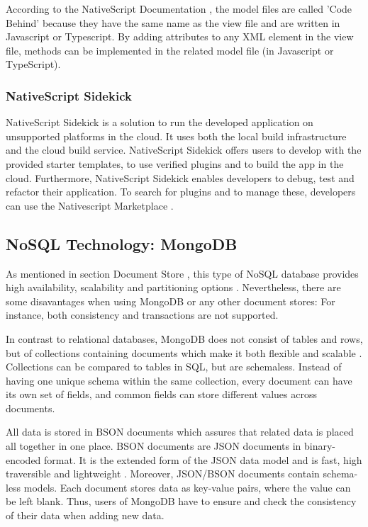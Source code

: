 According to the NativeScript Documentation \cite{nativescript}, the model files are called 'Code Behind' because they have the same name as the view file and are written in Javascript or Typescript. By adding attributes to any XML element in the view file, methods can be implemented in the related model file (in Javascript or TypeScript). 

\subsubsection{NativeScript Sidekick}\label{Native}

NativeScript Sidekick is a solution to run the developed application on unsupported platforms in the cloud. It uses both the local build infrastructure and the cloud build service. NativeScript Sidekick offers users to develop with the provided starter templates, to use verified plugins and to build the app in the cloud. Furthermore, NativeScript Sidekick enables developers to debug, test and refactor their application. 
To search for plugins and to manage these, developers can use the Nativescript Marketplace \cite{nsmarket}.

\subsection{NoSQL Technology: MongoDB}\label{mongodb}

As mentioned in section Document Store , this type of NoSQL database provides high availability, scalability and partitioning options \cite[p.25 ff.]{mongodb_edward}. Nevertheless, there are some disavantages when using MongoDB or any other document stores: For instance, both consistency and transactions are not supported. 

In contrast to relational databases, MongoDB does not consist of tables and rows, but of collections containing documents which make it both flexible and scalable \cite[p.25 ff.]{mongodb_edward}. Collections can be compared to tables in SQL, but are schemaless. Instead of having one unique schema within the same collection, every document can have its own set of fields, and common fields can store different values across documents.  

All data is stored in \ac{BSON} documents which assures that related data is placed all together in one place. BSON documents are JSON documents in binary-encoded format. It is the extended form of the JSON data model and is fast, high traversible and lightweight \cite[p.31 ff.]{mongodb_edward}. Moreover, JSON/BSON documents contain schema-less models. Each document stores data as key-value pairs, where the value can be left blank. Thus, users of MongoDB have to ensure and check the consistency of their data when adding new data.

